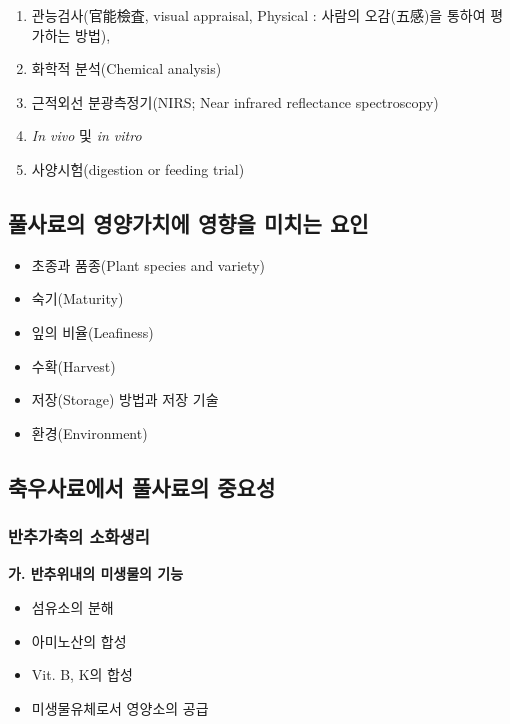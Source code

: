 \documentclass[]{book}
\providecommand{\tightlist}{%
  \setlength{\itemsep}{0pt}\setlength{\parskip}{0pt}}
\begin{document}
\begin{enumerate}
\def\labelenumi{\arabic{enumi}.}
\tightlist
\item
  관능검사(官能檢査, visual appraisal, Physical : 사람의 오감(五感)을
  통하여 평가하는 방법),
\item
  화학적 분석(Chemical analysis)
\item
  근적외선 분광측정기(NIRS; Near infrared reflectance spectroscopy)
\item
  \emph{In vivo} 및 \emph{in vitro}
\item
  사양시험(digestion or feeding trial)
\end{enumerate}

\subsection{풀사료의 영양가치에 영향을 미치는 요인}\label{----}

\begin{itemize}
\tightlist
\item
  초종과 품종(Plant species and variety)
\item
  숙기(Maturity)
\item
  잎의 비율(Leafiness)
\item
  수확(Harvest)
\item
  저장(Storage) 방법과 저장 기술
\item
  환경(Environment)
\end{itemize}

\subsection{축우사료에서 풀사료의 중요성}\label{--}

\subsubsection{반추가축의 소화생리}\label{-}

\textbf{가. 반추위내의 미생물의 기능}

\begin{itemize}
\tightlist
\item
  섬유소의 분해\\
\item
  아미노산의 합성\\
\item
  Vit. B, K의 합성\\
\item
  미생물유체로서 영양소의 공급
\end{itemize}
\end{document}

